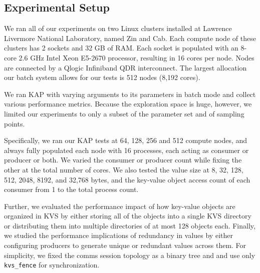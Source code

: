 \subsection{Experimental Setup}
We ran all of our experiments on two Linux clusters installed at 
Lawrence Livermore National Laboratory,
named Zin and Cab.
Each compute node of these clusters has 2 sockets and 32 GB of RAM.
Each socket is populated with an 8-core 2.6 GHz Intel
Xeon E5-2670 processor, resulting in 16 cores per node.
Nodes are connected by a Qlogic Infiniband QDR interconnect.
The largest allocation our batch system allows for our tests is
512 nodes (8,192 cores).

We ran KAP with varying arguments to its parameters
in batch mode and collect various 
performance metrics. 
Because the exploration
space is huge, however, we limited our experiments to
only a subset of the parameter set and of sampling points.

Specifically, we ran our KAP tests at 64, 128, 256 and 512
compute nodes, and always fully populated each node with
16 processes, each acting as consumer or producer or
both. We varied the consumer or producer count
while fixing the other at the total number of cores.
We also tested the value size at
8, 32, 128, 512, 2048, 8192, and 32,768 bytes,
and the key-value object access count of each consumer
from 1 to the total process count.

Further, we evaluated the performance impact 
of how key-value objects are organized 
in KVS by either storing all of the objects into a single KVS directory
or distributing them into multiple directories of at most 128 objects each.
Finally, we studied the performance implications of 
redundancy in values by either configuring producers to generate
unique or redundant values across them.
For simplicity, we fixed the comms session topology as a binary tree
and and use only {\tt kvs\_fence} for synchronization.
